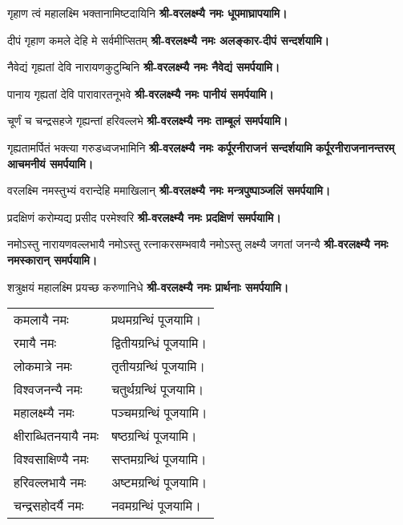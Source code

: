 \begin{center}
{गृहाण त्वं महालक्ष्मि भक्तानामिष्टदायिनि}
\textbf{श्री-वरलक्ष्म्यै नमः धूपमाघ्रापयामि।}
\medskip

{दीपं गृहाण कमले देहि मे सर्वमीप्सितम्}
\textbf{श्री-वरलक्ष्म्यै नमः अलङ्कार-दीपं सन्दर्शयामि। }
\medskip

{नैवेद्यं गृह्यतां देवि नारायणकुटुम्बिनि} 
\textbf{श्री-वरलक्ष्म्यै नमः नैवेद्यं समर्पयामि। }
\medskip

{पानाय गृह्यतां देवि पारावारतनूभवे} 
\textbf{श्री-वरलक्ष्म्यै नमः पानीयं समर्पयामि। }
\medskip


{चूर्णं च चन्द्रसहजे गृह्यन्तां हरिवल्लभे}
\textbf{श्री-वरलक्ष्म्यै नमः ताम्बूलं समर्पयामि। }
\medskip


{गृह्यतामर्पितं भक्त्या गरुडध्वजभामिनि}
\textbf{श्री-वरलक्ष्म्यै नमः कर्पूरनीराजनं  सन्दर्शयामि}
\textbf{कर्पूरनीराजनानन्तरम् आचमनीयं समर्पयामि।}
\medskip

{वरलक्ष्मि नमस्तुभ्यं वरान्देहि ममाखिलान्}
\textbf{श्री-वरलक्ष्म्यै नमः मन्त्रपुष्पाञ्जलिं समर्पयामि।}
\medskip

{प्रदक्षिणं करोम्यद्य प्रसीद परमेश्वरि}
\textbf{श्री-वरलक्ष्म्यै नमः प्रदक्षिणं समर्पयामि।}
\medskip

{नमोऽस्तु नारायणवल्लभायै }
{नमोऽस्तु रत्नाकरसम्भवायै} 
{नमोऽस्तु लक्ष्म्यै जगतां जनन्यै} 
\textbf{श्री-वरलक्ष्म्यै नमः नमस्कारान् समर्पयामि।}
\medskip

{शत्रुक्षयं महालक्ष्मि प्रयच्छ करुणानिधे}
\textbf{श्री-वरलक्ष्म्यै नमः प्रार्थनाः समर्पयामि।}
\medskip


\begin{longtable}{l@{— }l}
कमलायै नमः & प्रथमग्रन्थिं पूजयामि।\\
रमायै नमः & द्वितीयग्रन्धिं पूजयामि।\\
लोकमात्रे नमः & तृतीयग्रन्थिं पूजयामि।\\
विश्वजनन्यै नमः & चतुर्थग्रन्थिं पूजयामि।\\
महालक्ष्म्यै नमः & पञ्चमग्रन्थिं पूजयामि।\\
क्षीराब्धितनयायै नमः & षष्ठग्रन्थिं पूजयामि।\\
विश्वसाक्षिण्यै नमः & सप्तमग्रन्थिं पूजयामि।\\
हरिवल्लभायै नमः & अष्टमग्रन्थिं पूजयामि।\\
चन्द्रसहोदर्यै नमः & नवमग्रन्थिं पूजयामि।\\
\end{longtable}


\end{center}

